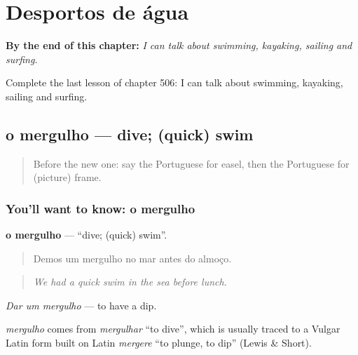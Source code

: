 
\chapter{Desportos de água}
\label{ch:pt-desportos-de-agua}

\begin{chapteropening}
\textbf{By the end of this chapter:} \emph{I can talk about swimming, kayaking, sailing and surfing.}

Complete the last lesson of chapter 506: I can talk about swimming, kayaking, sailing and surfing.
\end{chapteropening}

\section[o mergulho]{o mergulho — dive; (quick) swim}

\label{lesson:PT-C506-mergulho}



\begin{quote}
Before the new one: say the Portuguese for easel, then the Portuguese for (picture) frame.
\end{quote}

\subsection*{You'll want to know: o mergulho}
\textbf{o mergulho} — \textquotedblleft{}dive; (quick) swim\textquotedblright{}.

\begin{quote}
Demos um mergulho no mar antes do almoço.
\end{quote}

\begin{quote}
\emph{We had a quick swim in the sea before lunch.}
\end{quote}

\emph{Dar um mergulho} — to have a dip.

\begin{cousinweb}
\emph{mergulho} comes from \emph{mergulhar} \textquotedblleft{}to dive\textquotedblright{}, which is usually traced to a Vulgar Latin form built on Latin \emph{mergere} \textquotedblleft{}to plunge, to dip\textquotedblright{} (Lewis \& Short).
\end{cousinweb}

